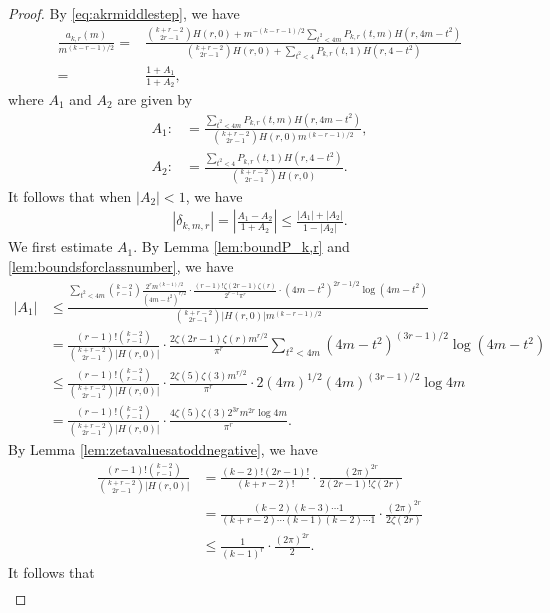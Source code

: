 \documentclass[10pt,a4paper]{amsart}
\begin{document}
\begin{proof}
By \eqref{eq:akrmiddlestep}, we have
\begin{align}
    \frac{a_{k,r}(m)}{m^{(k-r-1)/2}}
    =&\frac{\binom{k+r-2}{2r-1}H(r,0)+m^{-(k-r-1)/2}\sum_{t^2<4m}P_{k,r}(t,m)H(r,4m-t^2)}{\binom{k+r-2}{2r-1}H(r,0)+\sum_{t^2<4}P_{k,r}(t,1)H(r,4-t^2)}\\=&\frac{1+A_1}{1+A_2},
\end{align}
where $A_1$ and $A_2$ are given by
\begin{align}
    A_1:&=\frac{\sum_{t^2<4m}P_{k,r}(t,m)H(r,4m-t^2)}{\binom{k+r-2}{2r-1}H(r,0)m^{(k-r-1)/2}},\\A_2:&=\frac{\sum_{t^2<4}P_{k,r}(t,1)H(r,4-t^2)}{\binom{k+r-2}{2r-1}H(r,0)}.
\end{align}
It follows that when $|A_2|<1$, we have
\begin{align}|\delta_{k,m,r}|=\left|\frac{A_1-A_2}{1+A_2}\right|\leq\frac{|A_1|+|A_2|}{1-|A_2|}.\label{eq:md}\end{align}
We first estimate $A_1$. By Lemma \ref{lem:boundP_k,r} and \ref{lem:boundsforclassnumber}, we have
\begin{align}
|A_1|&\leq\frac{\sum_{t^2<4m}\binom{k-2}{r-1}\frac{2^rm^{(k-1)/2}}{(4m-t^2)^{r/2}}\cdot\frac{(r-1)!\zeta(2r-1)\zeta(r)}
   {2^{r-1}\pi^r}\cdot(4m-t^2)^{2r-1/2}\log(4m-t^2)}{\binom{k+r-2}{2r-1}|H(r,0)|m^{(k-r-1)/2}}   
\\&=\frac{(r-1)!\binom{k-2}{r-1}}{\binom{k+r-2}{2r-1}|H(r,0)|}\cdot\frac{2\zeta(2r-1)\zeta(r)m^{r/2}}{\pi^r}\sum_{t^2<4m}(4m-t^2)^{(3r-1)/2}\log(4m-t^2)\\&\leq\frac{(r-1)!\binom{k-2}{r-1}}{\binom{k+r-2}{2r-1}|H(r,0)|}\cdot\frac{2\zeta(5)\zeta(3)m^{r/2}}{\pi^r}\cdot2(4m)^{1/2}(4m)^{(3r-1)/2}\log4m\\&=\frac{(r-1)!\binom{k-2}{r-1}}{\binom{k+r-2}{2r-1}|H(r,0)|}\cdot\frac{4\zeta(5)\zeta(3)2^{3r}m^{2r}\log4m}{\pi^r}.
\end{align}
By Lemma \ref{lem:zetavaluesatoddnegative}, we have 
\begin{align}
    \frac{(r-1)!\binom{k-2}{r-1}}{\binom{k+r-2}{2r-1}|H(r,0)|}&=\frac{(k-2)!(2r-1)!}{(k+r-2)!}\cdot\frac{(2\pi)^{2r}}{
    2(2r-1)!\zeta(2r)}\\&=\frac{(k-2)(k-3)\cdots1}{(k+r-2)\cdots(k-1)(k-2)\cdots1}\cdot\frac{(2\pi)^{2r}}{2\zeta(2r)}\\&\leq\frac{1}{(k-1)^{r}}\cdot\frac{(2\pi)^{2r}}{2}.
\end{align}
It follows that 
\begin{align}

\end{align}
\end{proof}
\end{document}
